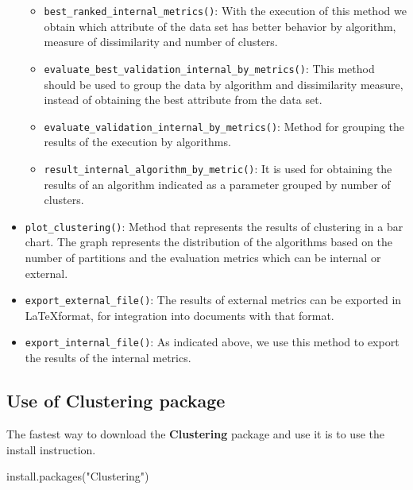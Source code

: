 \documentclass[
]{article}
\newenvironment{Shaded}{\begin{snugshade}}{\end{snugshade}}
\newcommand{\FunctionTok}[1]{\textcolor[rgb]{0.00,0.00,0.00}{#1}}
\newcommand{\NormalTok}[1]{#1}
\newcommand{\StringTok}[1]{\textcolor[rgb]{0.31,0.60,0.02}{#1}}
\providecommand{\tightlist}{%
  \setlength{\itemsep}{0pt}\setlength{\parskip}{0pt}}
\begin{document}
\begin{itemize}
  \begin{itemize}
  \tightlist
  \item
    \texttt{best\_ranked\_internal\_metrics()}: With the execution of
    this method we obtain which attribute of the data set has better
    behavior by algorithm, measure of dissimilarity and number of
    clusters.
  \item
    \texttt{evaluate\_best\_validation\_internal\_by\_metrics()}: This
    method should be used to group the data by algorithm and
    dissimilarity measure, instead of obtaining the best attribute from
    the data set.
  \item
    \texttt{evaluate\_validation\_internal\_by\_metrics()}: Method for
    grouping the results of the execution by algorithms.
  \item
    \texttt{result\_internal\_algorithm\_by\_metric()}: It is used for
    obtaining the results of an algorithm indicated as a parameter
    grouped by number of clusters.
  \end{itemize}
\item
  \texttt{plot\_clustering()}: Method that represents the results of
  clustering in a bar chart. The graph represents the distribution of
  the algorithms based on the number of partitions and the evaluation
  metrics which can be internal or external.
\item
  \texttt{export\_external\_file()}: The results of external metrics can
  be exported in \LaTeX format, for integration into documents with that
  format.
\item
  \texttt{export\_internal\_file()}: As indicated above, we use this
  method to export the results of the internal metrics.
\end{itemize}

\hypertarget{use-of-clustering-package}{%
\subsection{\texorpdfstring{Use of \textbf{Clustering}
package}{Use of Clustering package}}\label{use-of-clustering-package}}

The fastest way to download the \textbf{Clustering} package and use it
is to use the install instruction.

\begin{Shaded}
\begin{Highlighting}[]
\FunctionTok{install.packages}\NormalTok{(}\StringTok{"Clustering"}\NormalTok{)}
\end{Highlighting}
\end{Shaded}
\end{document}
